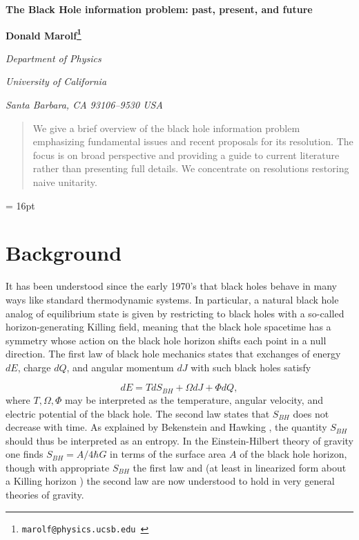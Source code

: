\documentclass[10pt]{article}
\begin{document}



\begin{titlepage}
\bigskip
\bigskip\bigskip\bigskip
\centerline{\Large \bf The Black Hole information problem: past, present, and future}

\bigskip\bigskip\bigskip
\bigskip\bigskip\bigskip


 \centerline
 {\bf Donald Marolf\footnote{\tt marolf@physics.ucsb.edu }}
 \medskip


\centerline{\em Department of Physics}
\centerline{\em University of California}
\centerline{\em Santa Barbara, CA 93106--9530 USA}

\bigskip\bigskip\bigskip

\bigskip\bigskip\bigskip


\begin{abstract}
We give a brief overview of the black hole information problem emphasizing fundamental issues and recent proposals for its resolution.  The focus is on broad perspective and providing a guide to current literature rather than presenting full details.  We concentrate on resolutions restoring naive unitarity.
\end{abstract}
\end{titlepage}

\baselineskip = 16pt


\section{Background}

It has been understood since the early 1970's that black holes behave in many ways like standard thermodynamic systems.  In particular, a natural black hole analog of equilibrium state is given by restricting to black holes with a so-called horizon-generating Killing field, meaning that the black hole spacetime has a symmetry whose action on the black hole horizon shifts each point in a null direction.  The first law of black hole mechanics states that exchanges of energy $dE$, charge $dQ$, and angular momentum $dJ$ with such black holes satisfy

\begin{equation}
\label{FirstLaw}
dE = T dS_{BH} + \Omega dJ + \Phi dQ,
\end{equation}
where $T, \Omega, \Phi$ may be interpreted as the temperature, angular velocity, and electric potential of the black hole.   The second law states that $S_{BH}$ does not decrease with time.  As explained by Bekenstein \cite{Bekenstein:1973ur} and Hawking \cite{Hawking:1974sw}, the quantity $S_{BH}$ should thus be interpreted as an entropy.   In the Einstein-Hilbert theory of gravity one finds $S_{BH} = A/4\hbar G$ in terms of the surface area $A$ of the black hole horizon, though with appropriate $S_{BH}$ the first law \cite{Wald:1993nt} and (at least in linearized form about a Killing horizon \cite{Wall:2015raa}) the second law are now understood to hold  in very general theories of gravity.
\end{document}
